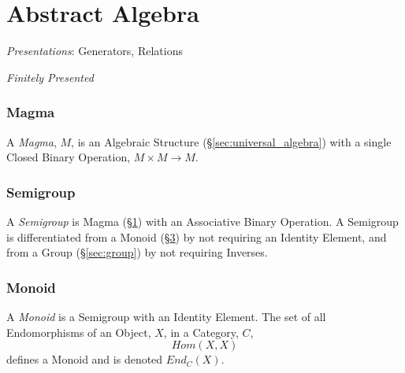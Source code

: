 \part{Abstract Algebra}\label{sec:abstract_algebra}

\emph{Presentations}: Generators, Relations

\emph{Finitely Presented}



\section{Magma}\label{sec:magma}

A \emph{Magma}, $M$, is an Algebraic Structure
(\S\ref{sec:universal_algebra}) with a single Closed Binary
Operation, $M \times M \rightarrow M$.



\section{Semigroup}\label{sec:semigroup}

A \emph{Semigroup} is Magma (\S\ref{sec:magma}) with an Associative
Binary Operation. A Semigroup is differentiated from a Monoid
(\S\ref{sec:monoid}) by not requiring an Identity Element, and from
a Group (\S\ref{sec:group}) by not requiring Inverses.



\section{Monoid}\label{sec:monoid}

A \emph{Monoid} is a Semigroup with an Identity Element. The set of
all Endomorphisms of an Object, $X$, in a Category, $C$,
\[
    Hom(X,X)
\]
defines a Monoid and is denoted $End_C(X)$.

